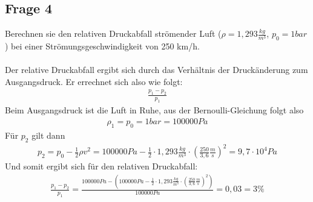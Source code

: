 \documentclass[a4paper,10pt]{scrartcl}
\begin{document}
		\subsection{Frage 4}
			Berechnen sie den relativen Druckabfall strömender Luft (\(\rho=1,293\frac{kg}{m^{3}}\), \(p_{0}=1bar\)) bei
			einer Strömungsgeschwindigkeit von 250 km/h.\\
			\\
			Der relative Druckabfall ergibt sich durch das Verhältnis der Druckänderung zum Ausgangsdruck. Er errechnet sich also wie folgt:
			\begin{align*}
			\frac{p_{1}-p_{2}}{p_{1}}
			\end{align*}
			Beim Ausgangsdruck ist die Luft in Ruhe, aus der Bernoulli-Gleichung folgt also
			\begin{align*}
			\rho_{1}=p_{0}=1bar=100000Pa
			\end{align*}
			Für \(p_{2}\) gilt dann
			\begin{align*}
			p_{2}=p_{0}-\frac{1}{2}\rho v^{2}=100000Pa-\frac{1}{2}\cdot 1,293\frac{kg}{m^{3}}\cdot (\frac{250}{3,6}\frac{m}{s})^{2}=9,7\cdot 10^{4}Pa
			\end{align*}
			Und somit ergibt sich für den relativen Druckabfall:
			\begin{align*}
			\frac{p_{1}-p_{2}}{p_{1}}=\frac{100000Pa-(100000Pa-\frac{1}{2}\cdot 1,293\frac{kg}{m^{3}}\cdot (\frac{250}{3,6}\frac{m}{s})^{2})}{100000Pa}=0,03=3\%
			\end{align*}
			
\end{document}
